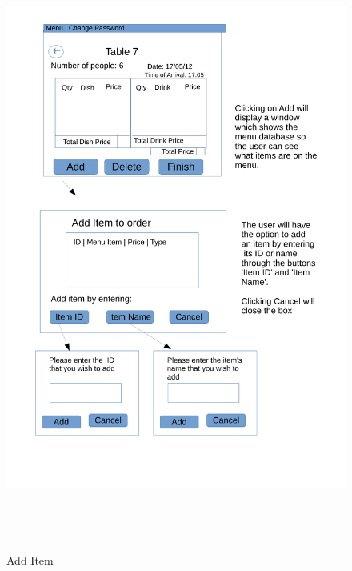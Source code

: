 \begin{figure}[H]
    \includegraphics[height = 20cm]{./Design/Images/Interface3}
    \caption{Add Item} \label{fig:Add}
\end{figure}

